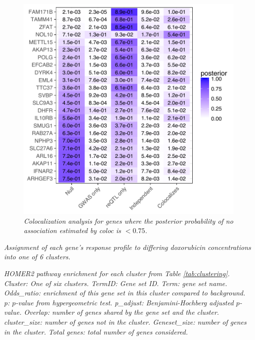 \documentclass{article}
\begin{document}
\begin{figure}[h]
\begin{center}
    \includegraphics[width=.7\textwidth]{../figures/coloc.pdf} 
    \caption{\it{Colocalization analysis for genes where the posterior probability of no association estimated by \emph{coloc} is $<0.75$.}}
    \label{fig:coloc}
    \end{center}
\end{figure}
\setcounter{table}{0}
\makeatletter 
\renewcommand{\thetable}{S\@arabic\c@table}

\begin{table} %
    \caption{\it{Assignment of each gene's response profile to differing doxorubicin concentrations into one of 6 clusters.}}
    \label{tab:clustering}
\end{table}

\begin{table}%
    \caption{\it{HOMER2 pathway enrichment for each cluster from Table \ref{tab:clustering}.  \emph{Cluster:} One of six clusters. \emph{TermID}: Gene set ID. \emph{Term}: gene set name.  \emph{Odds\_ratio}: enrichment of this gene set in this cluster compared to background. \emph{p}: $p$-value from hypergeometric test. \emph{p\_adjust}: Benjamini-Hochberg adjusted $p$-value. \emph{Overlap}: number of genes shared by the gene set and the cluster. \emph{cluster\_size}: number of genes not in the cluster.  \emph{Geneset\_size}: number of genes in the cluster. \emph{Total genes}: total number of genes considered.}}
    \label{tab:pathway_enrich}
\end{table}
\end{document}
